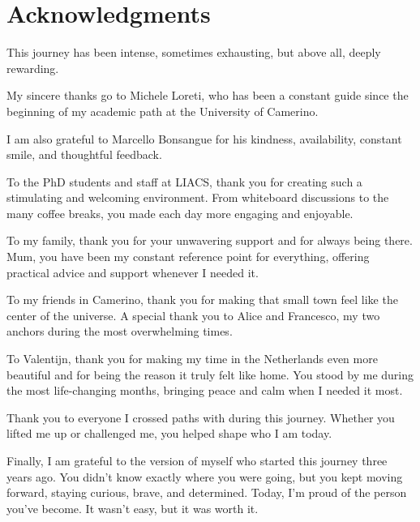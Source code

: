 \chapter*{Acknowledgments}

This journey has been intense, sometimes exhausting, but above all, deeply rewarding.

My sincere thanks go to Michele Loreti, who has been a constant guide since the beginning of my academic path at the University of Camerino. 

I am also grateful to Marcello Bonsangue for his kindness, availability, constant smile, and thoughtful feedback.

To the PhD students and staff at LIACS, thank you for creating such a stimulating and welcoming environment. From whiteboard discussions to the many coffee breaks, you made each day more engaging and enjoyable.

To my family, thank you for your unwavering support and for always being there. Mum, you have been my constant reference point for everything, offering practical advice and support whenever I needed it.

To my friends in Camerino, thank you for making that small town feel like the center of the universe. A special thank you to Alice and Francesco, my two anchors during the most overwhelming times.

To Valentijn, thank you for making my time in the Netherlands even more beautiful and for being the reason it truly felt like home. You stood by me during the most life-changing months, bringing peace and calm when I needed it most.

Thank you to everyone I crossed paths with during this journey. Whether you lifted me up or challenged me, you helped shape who I am today.

Finally, I am grateful to the version of myself who started this journey three years ago. You didn't know exactly where you were going, but you kept moving forward, staying curious, brave, and determined. Today, I'm proud of the person you've become. It wasn't easy, but it was worth it.

